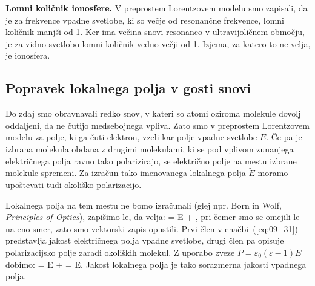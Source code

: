 \begin{example}{\bf Lomni količnik ionosfere.}
V preprostem Lorentzovem modelu smo zapisali, da je za frekvence vpadne svetlobe,
ki so večje od resonančne frekvence, lomni količnik manjši od 1. Ker ima večina
snovi resonanco v ultravijoličnem območju, je za vidno svetlobo lomni količnik
vedno večji od 1. Izjema, za katero to ne velja, je ionosfera. 

\end{example}

\subsection*{Popravek lokalnega polja v gosti snovi}
Do zdaj smo obravnavali redko snov, v kateri so atomi oziroma molekule
dovolj oddaljeni, da ne čutijo medsebojnega vpliva. 
Zato smo v preprostem Lorentzovem modelu za polje, ki ga čuti elektron, 
vzeli kar polje vpadne svetlobe $E$. Če pa je izbrana molekula obdana
z drugimi molekulami, ki se pod vplivom zunanjega električnega polja 
ravno tako polarizirajo, se  električno polje na mestu izbrane 
molekule spremeni. Za izračun tako imenovanega lokalnega polja $\tilde{E}$
moramo upoštevati tudi okoliško polarizacijo.

Lokalnega polja na tem mestu ne bomo izračunali (glej npr. Born in Wolf, {\it
Principles of Optics}), zapišimo le, da velja:
\beq
{} = E + ,
\label{eq:09_31}
\eeq
pri čemer smo se omejili le na eno smer, zato smo vektorski zapis opustili. 
Prvi člen v enačbi~(\ref{eq:09_31}) predstavlja jakost električnega 
polja vpadne svetlobe, drugi člen pa opisuje polarizacijsko 
polje zaradi okoliških molekul. Z uporabo zveze
$P = \varepsilon_0 (\varepsilon -1) E$ dobimo:
\beq
{} = E +  = 
E.
\label{eq:09_32}
\eeq
Jakost lokalnega polja je tako sorazmerna jakosti vpadnega polja. 

